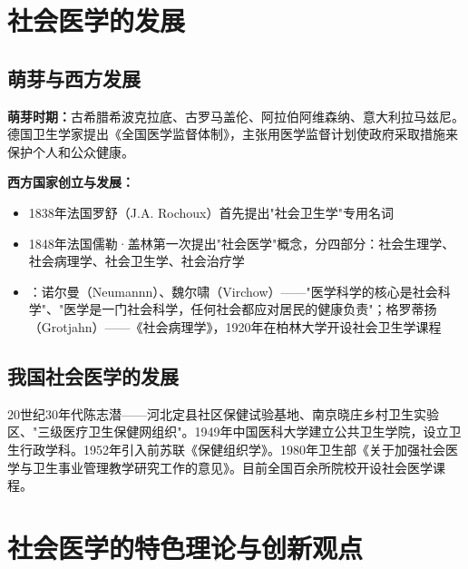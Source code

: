 \section{社会医学的发展}

\subsection{萌芽与西方发展}

\begin{defbox}
\textbf{萌芽时期：}古希腊希波克拉底、古罗马盖伦、阿拉伯阿维森纳、意大利拉马兹尼。德国卫生学家提出《全国医学监督体制》，主张用医学监督计划使政府采取措施来保护个人和公众健康。

\textbf{西方国家创立与发展：}
\begin{itemize}[leftmargin=*]
    \item 1838年法国罗舒（J.A. Rochoux）首先提出"社会卫生学"专用名词
    \item 1848年法国儒勒·盖林第一次提出"社会医学"概念，分四部分：社会生理学、社会病理学、社会卫生学、社会治疗学
    \item {}：诺尔曼（Neumannn）、魏尔啸（Virchow）——"医学科学的核心是社会科学"、"医学是一门社会科学，任何社会都应对居民的健康负责"；格罗蒂扬（Grotjahn）——《社会病理学》，1920年在柏林大学开设社会卫生学课程
\end{itemize}
\end{defbox}

\subsection{我国社会医学的发展}

\begin{defbox}
20世纪30年代陈志潜——河北定县社区保健试验基地、南京晓庄乡村卫生实验区、"三级医疗卫生保健网组织"。1949年中国医科大学建立公共卫生学院，设立卫生行政学科。1952年引入前苏联《保健组织学》。1980年卫生部《关于加强社会医学与卫生事业管理教学研究工作的意见》。目前全国百余所院校开设社会医学课程。
\end{defbox}

\section{社会医学的特色理论与创新观点}

